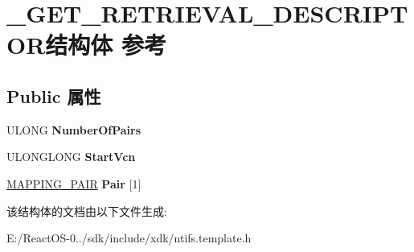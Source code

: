 \hypertarget{struct___g_e_t___r_e_t_r_i_e_v_a_l___d_e_s_c_r_i_p_t_o_r}{}\section{\+\_\+\+G\+E\+T\+\_\+\+R\+E\+T\+R\+I\+E\+V\+A\+L\+\_\+\+D\+E\+S\+C\+R\+I\+P\+T\+O\+R结构体 参考}
\label{struct___g_e_t___r_e_t_r_i_e_v_a_l___d_e_s_c_r_i_p_t_o_r}
\subsection*{Public 属性}
\begin{DoxyCompactItemize}
\item 
\mbox{\label{struct___g_e_t___r_e_t_r_i_e_v_a_l___d_e_s_c_r_i_p_t_o_r_a04514c7e23077724b8a94663327d1bf6}} 
U\+L\+O\+NG {\bfseries Number\+Of\+Pairs}
\item 
\mbox{\label{struct___g_e_t___r_e_t_r_i_e_v_a_l___d_e_s_c_r_i_p_t_o_r_a97ffdff935aa54ec9390e8373989fd3c}} 
U\+L\+O\+N\+G\+L\+O\+NG {\bfseries Start\+Vcn}
\item 
\mbox{\label{struct___g_e_t___r_e_t_r_i_e_v_a_l___d_e_s_c_r_i_p_t_o_r_a207d1af264d8c2d30a505bb1a2d32858}} 
\hyperlink{struct___m_a_p_p_i_n_g___p_a_i_r}{M\+A\+P\+P\+I\+N\+G\+\_\+\+P\+A\+IR} {\bfseries Pair} \mbox{[}1\mbox{]}
\end{DoxyCompactItemize}


该结构体的文档由以下文件生成\+:\begin{DoxyCompactItemize}
\item 
E\+:/\+React\+O\+S-\/0../sdk/include/xdk/ntifs.\+template.\+h\end{DoxyCompactItemize}
